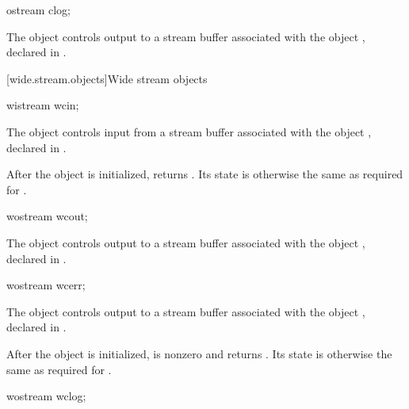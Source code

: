 %
\begin{itemdecl}
ostream clog;
\end{itemdecl}

\begin{itemdescr}
\pnum
The object 
controls output to a stream buffer
associated with the object ,
declared in .
\end{itemdescr}

[wide.stream.objects]{Wide stream objects}

%
\begin{itemdecl}
wistream wcin;
\end{itemdecl}

\begin{itemdescr}
\pnum
The object 
controls input from a stream buffer associated with the object ,
declared in .

\pnum
After the object
is initialized,
returns
.
Its state is otherwise the same as required for
.
\end{itemdescr}

%
\begin{itemdecl}
wostream wcout;
\end{itemdecl}

\begin{itemdescr}
\pnum
The object 
controls output to a stream buffer associated with the object ,
declared in .
\end{itemdescr}

%
\begin{itemdecl}
wostream wcerr;
\end{itemdecl}

\begin{itemdescr}
\pnum
The object 
controls output to a stream buffer associated with the object ,
declared in .

\pnum
After the object
is initialized,
is nonzero and  returns .
Its state is otherwise the same as required for
.
\end{itemdescr}

%
\begin{itemdecl}
wostream wclog;
\end{itemdecl}

